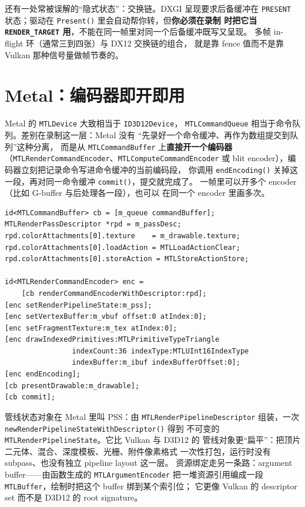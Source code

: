 \documentclass[12pt,a4paper,fontset=fandol]{ctexbook}
\newcommand{\Fn}[1]{\texttt{#1()}}
\newcommand{\Tp}[1]{\texttt{#1}}
\newcommand{\Bk}{\discretionary{}{}{}}
\newcommand{\Lang}[1]{\textsf{#1}}
\begin{document}
还有一处常被误解的``隐式状态''：交换链。DXGI 呈现要求后备缓冲在
\Tp{PRESENT} 状态；驱动在 \Fn{Present} 里会自动帮你转，但\textbf{你必须在录制
时把它当 \Tp{RENDER\_TARGET} 用}，不能在同一帧里对同一个后备缓冲既写又呈现。
多帧 in-flight 环（通常三到四张）与 DX12 交换链的组合，
就是靠 fence 值而不是靠 Vulkan 那种信号量做帧节奏的。

\section{Metal：编码器即开即用}

\Lang{Metal} 的 \Tp{MTL\Bk Device} 大致相当于 \Tp{ID3D12\Bk Device}，
\Tp{MTL\Bk Command\Bk Queue} 相当于命令队列。差别在录制这一层：Metal 没有
``先录好一个命令缓冲、再作为数组提交到队列''这种分离，
而是从 \Tp{MTL\Bk Command\Bk Buffer} 上\textbf{直接开一个编码器}
（\Tp{MTL\Bk Render\Bk Command\Bk Encoder}、\Tp{MTL\Bk Compute\Bk Command\Bk Encoder}
或 blit encoder），编码器立刻把记录命令写进命令缓冲的当前编码段，
你调用 \Fn{endEncoding} 关掉这一段，再对同一命令缓冲 \Fn{commit}，提交就完成了。
一帧里可以开多个 encoder（比如 G-buffer 与后处理各一段），也可以
在同一个 encoder 里画多次。

\begin{lstlisting}[style=cppstyle,caption={Metal 的一帧：开编码器、绘制、呈现、提交},label={lst:ch10-metal-frame}]
id<MTLCommandBuffer> cb = [m_queue commandBuffer];
MTLRenderPassDescriptor *rpd = m_passDesc;
rpd.colorAttachments[0].texture    = m_drawable.texture;
rpd.colorAttachments[0].loadAction = MTLLoadActionClear;
rpd.colorAttachments[0].storeAction = MTLStoreActionStore;

id<MTLRenderCommandEncoder> enc =
    [cb renderCommandEncoderWithDescriptor:rpd];
[enc setRenderPipelineState:m_pss];
[enc setVertexBuffer:m_vbuf offset:0 atIndex:0];
[enc setFragmentTexture:m_tex atIndex:0];
[enc drawIndexedPrimitives:MTLPrimitiveTypeTriangle
                indexCount:36 indexType:MTLUInt16IndexType
                indexBuffer:m_ibuf indexBufferOffset:0];
[enc endEncoding];
[cb presentDrawable:m_drawable];
[cb commit];
\end{lstlisting}

管线状态对象在 Metal 里叫 PSS：由 \Tp{MTL\Bk Render\Bk Pipeline\Bk Descriptor}
组装，一次 \Fn{new\Bk Render\Bk Pipeline\Bk State\Bk With\Bk Descriptor} 得到
不可变的 \Tp{MTL\Bk Render\Bk Pipeline\Bk State}。它比 Vulkan 与 D3D12 的
管线对象更``扁平''：把顶片二元体、混合、深度模板、光栅、附件像素格式
一次性打包，运行时没有 subpass、也没有独立 pipeline layout 这一层。
资源绑定走另一条路：argument buffer——由函数生成的 \Tp{MTL\Bk Argument\Bk Encoder}
把一堆资源引用编成一段 \Tp{MTL\Bk Buffer}，绘制时把这个 buffer 绑到某个索引位；
它更像 Vulkan 的 descriptor set 而不是 D3D12 的 root signature。
\end{document}
